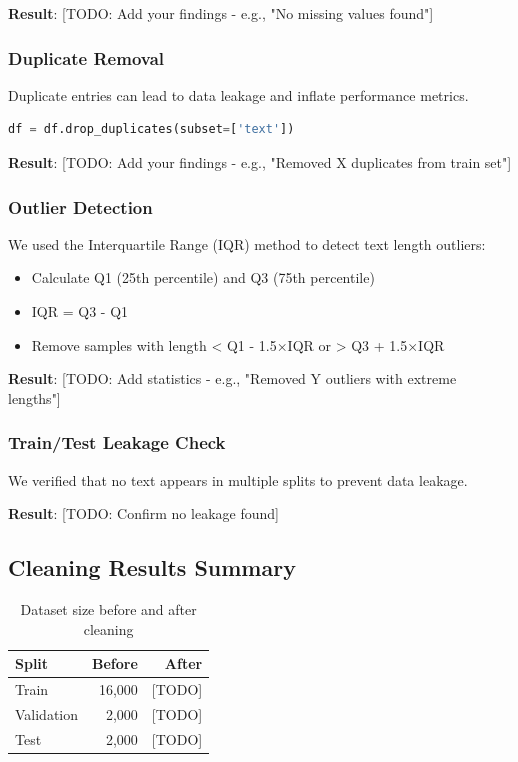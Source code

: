 \documentclass[12pt,a4paper]{article}
\begin{document}
\textbf{Result}: [TODO: Add your findings - e.g., "No missing values found"]

\subsubsection{Duplicate Removal}
Duplicate entries can lead to data leakage and inflate performance metrics.

\begin{lstlisting}[language=Python, caption={Duplicate removal}]
df = df.drop_duplicates(subset=['text'])
\end{lstlisting}

\textbf{Result}: [TODO: Add your findings - e.g., "Removed X duplicates from train set"]

\subsubsection{Outlier Detection}
We used the Interquartile Range (IQR) method to detect text length outliers:
\begin{itemize}
    \item Calculate Q1 (25th percentile) and Q3 (75th percentile)
    \item IQR = Q3 - Q1
    \item Remove samples with length < Q1 - 1.5×IQR or > Q3 + 1.5×IQR
\end{itemize}

\textbf{Result}: [TODO: Add statistics - e.g., "Removed Y outliers with extreme lengths"]

\subsubsection{Train/Test Leakage Check}
We verified that no text appears in multiple splits to prevent data leakage.

\textbf{Result}: [TODO: Confirm no leakage found]

\subsection{Cleaning Results Summary}
\begin{table}[H]
\centering
\begin{tabular}{@{}lrr@{}}
\toprule
\textbf{Split} & \textbf{Before} & \textbf{After} \\ \midrule
Train & 16,000 & [TODO] \\
Validation & 2,000 & [TODO] \\
Test & 2,000 & [TODO] \\ \bottomrule
\end{tabular}
\caption{Dataset size before and after cleaning}
\label{tab:cleaning}
\end{table}
\end{document}

